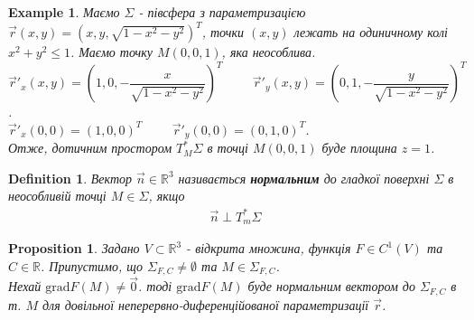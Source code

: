 \documentclass[a4paper, 10pt]{article}
\theoremstyle{theoremdd}
\theoremstyle{theoremdd}
\newtheorem{definition}[theorem]{Definition}
\theoremstyle{theoremdd}
\theoremstyle{theoremdd}
\newtheorem{example}[theorem]{Example}
\theoremstyle{theoremdd}
\newtheorem{proposition}[theorem]{Proposition}
\theoremstyle{theoremdd}
\theoremstyle{theoremdd}
\theoremstyle{theoremdd}
\begin{document}
\begin{example}
Маємо $\Sigma$ - півсфера з параметризацією $\vec{r}(x,y) = (x,y,\sqrt{1-x^2-y^2})^T$, точки $(x,y)$ лежать на одиничному колі $x^2+y^2 \leq 1$. Маємо точку $M(0,0,1)$, яка неособлива.\\
$\vec{r}'_x(x,y) = \left( 1,0 , -\dfrac{x}{\sqrt{1-x^2-y^2}} \right)^T \hspace{1cm} \vec{r}'_y(x,y) = \left( 0,1 , -\dfrac{y}{\sqrt{1-x^2-y^2}} \right)^T$.\\
$\vec{r}'_x(0,0) = (1,0,0)^T \hspace{1cm} \vec{r}'_y(0,0) = (0,1,0)^T$.\\
Отже, дотичним простором $T^*_M \Sigma$ в точці $M(0,0,1)$ буде площина $z = 1$.
\begin{figure}[H]
\centering
{}
\end{figure}
\end{example}

\begin{definition}
Вектор $\vec{n} \in \mathbb{R}^3$ називається \textbf{нормальним} до гладкої поверхні $\Sigma$ в неособливій точці $M \in \Sigma$, якщо
\begin{align*}
\vec{n} \perp T_m^*\Sigma
\end{align*}
\end{definition}

\begin{proposition}
Задано $V \subset \mathbb{R}^3$ - відкрита множина, функція $F \in C^1(V)$ та $C \in \mathbb{R}$. Припустимо, що $\Sigma_{F,C} \neq \emptyset$ та $M \in \Sigma_{F,C}$.\\
Нехай $\text{grad} F(M) \neq \vec{0}$. тоді $\text{grad} F(M)$ буде нормальним вектором до $\Sigma_{F,C}$ в т. $M$ для довільної неперервно-диференційованої параметризації $\vec{r}$.
\end{proposition}
\end{document}
